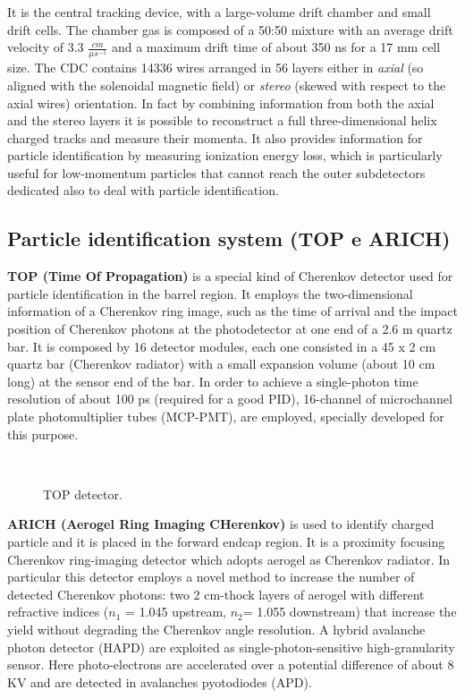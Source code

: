 It is the central tracking device, with a large-volume drift chamber and small drift cells. The chamber gas is composed of a  50:50 mixture with an average drift velocity of 3.3 $\frac{cm}{\mu s^{-1}}$ and a maximum drift time of about 350 ns for a 17 mm cell size.
The CDC contains 14336 wires  arranged in 56 layers either in \textit{axial}  (so aligned with the solenoidal magnetic field) or \textit{stereo} (skewed with respect to the axial wires) orientation. In fact by combining information from both the axial and the stereo layers it is possible to reconstruct a full three-dimensional helix charged tracks and measure their momenta.
It also provides information for particle identification by measuring ionization energy loss, which is particularly useful for low-momentum particles that cannot reach the outer subdetectors dedicated	also to deal with particle identification.


\subsection{Particle identification system (TOP e ARICH)}

\textbf{TOP (Time Of Propagation)} is a special kind of Cherenkov detector used for particle identification in the barrel region. It employs the two-dimensional information of a Cherenkov ring image, such as the time of arrival and the impact position of Cherenkov photons at the photodetector at one end of a 2.6 m quartz bar. It is composed by 16 detector modules, each one consisted in a 45 x 2 cm quartz bar (Cherenkov radiator) with a small expansion volume (about 10 cm long) at the sensor end of the bar. In order to achieve a single-photon time resolution of about 100 ps (required for a good PID), 16-channel of microchannel plate photomultiplier tubes (MCP-PMT),  are employed, specially developed for this purpose.\\

\begin{figure}[h!]
\centering
{}\quad
{}\\
\caption{TOP detector.}
\label{TOP}
\end{figure}

\textbf{ARICH (Aerogel Ring Imaging CHerenkov)} is used to identify charged particle and it is placed in the forward endcap region. It is a proximity focusing Cherenkov ring-imaging detector which adopts aerogel as Cherenkov radiator. In particular this detector employs a novel method to increase the number of detected Cherenkov photons: two 2 cm-thock layers of aerogel with different refractive indices ($n_{1}$ = 1.045 upstream, $n_{2}$= 1.055 downstream) that increase the yield without degrading the Cherenkov angle resolution.
A hybrid avalanche photon detector (HAPD) are exploited as single-photon-sensitive high-granularity sensor. Here photo-electrons are accelerated over a potential difference of about 8 KV and are detected in avalanches pyotodiodes (APD).\\

